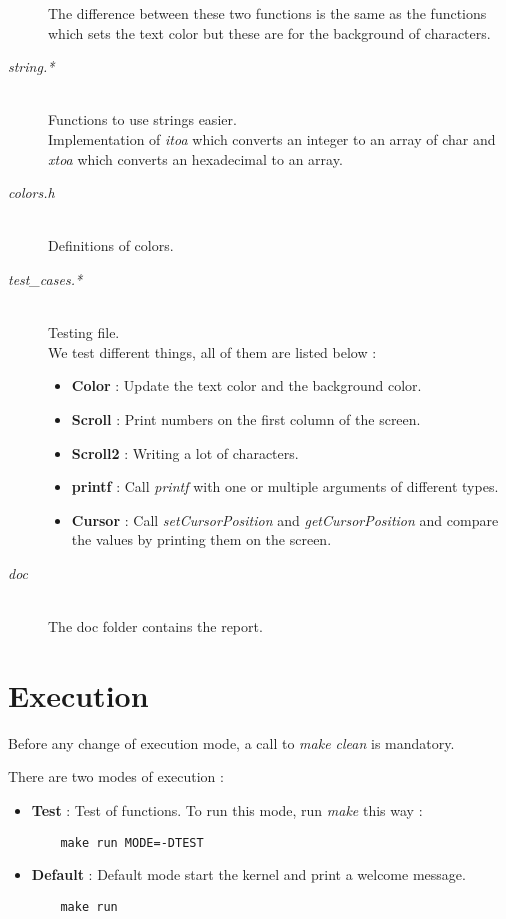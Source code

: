 \documentclass[a4paper]{article}
\begin{document}
\begin{description}
The difference between these two functions is the same as the functions which sets the text color but these are for the background of characters.

\item[\textit{string.*}] \hfill \\
Functions to use strings easier. \\
Implementation of \textit{itoa} which converts an integer to an array of char and \textit{xtoa} which converts an hexadecimal to an array.

\item[\textit{colors.h}] \hfill \\
Definitions of colors.

\item[\textit{test\_cases.*}] \hfill \\
Testing file.\\
We test different things, all of them are listed below :
\begin{itemize}
\item \textbf{Color} : Update the text color and the background color.
\item \textbf{Scroll} : Print numbers on the first column of the screen.
\item \textbf{Scroll2} : Writing a lot of characters.
\item \textbf{printf} : Call \textit{printf} with one or multiple arguments of different types.
\item \textbf{Cursor} : Call \textit{setCursorPosition} and \textit{getCursorPosition} and compare the values by printing them on the screen.
\end{itemize}

\item[\textit{doc}] \hfill \\
The doc folder contains the report.

\end{description}
\newpage
\section{Execution}

Before any change of execution mode, a call to \textit{make clean} is mandatory.

There are two modes of execution : 

\begin{itemize}
  \item \textbf{Test} : Test of functions. To run this mode, run \textit{make} this way :
    \begin{verbatim}
    make run MODE=-DTEST
    \end{verbatim}
  \item \textbf{Default} : Default mode start the kernel and print a welcome message.
    \begin{verbatim}
    make run
    \end{verbatim}
\end{itemize}
\end{document}
